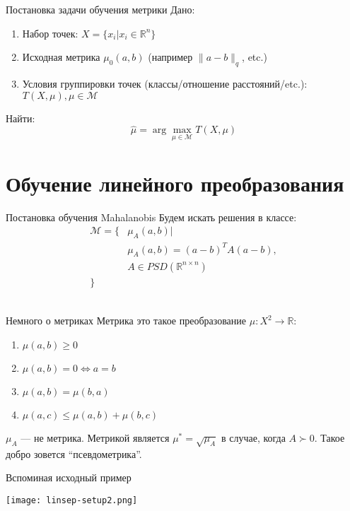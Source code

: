\documentclass[14pt, fleqn, xcolor={dvipsnames, table}]{beamer}
\begin{document}
\begin{frame}{Постановка задачи обучения метрики}{}
{\color{blue}Дано:}
\begin{enumerate}
  \item Набор точек: $X = \{x_i | x_i \in \mathbb{R}^n\}$
  \item Исходная метрика $\mu_0(a,b)$ (например $\|a - b\|_q$, etc.)
  \item Условия группировки точек (классы/отношение расстояний/etc.): $T(X, \mu), \mu \in \mathcal{M}$
\end{enumerate}
{\color{blue}Найти:}\\
$$
\hat{\mu} = \arg \max_{\mu \in \mathcal{M}} T(X, \mu)
$$
\end{frame}

\section{Обучение линейного преобразования}

\begin{frame}{Постановка обучения Mahalanobis}{}
Будем искать решения в классе:
$$\begin{array}{ll}
\mathcal{M} = \{&\mu_A(a,b) | \\
& \mu_A(a,b) = (a - b)^T A (a - b), \\
& A \in PSD(\mathbb{R}^{n \times n})\\
\} &
\end{array}$$
\\
\end{frame}

\begin{frame}{Немного о метриках}{}
\small
Метрика это такое преобразование $\mu : X^2 \to \mathbb{R}$:
\begin{enumerate}
  \item $\mu(a,b) \ge 0$
  \item $\mu(a,b) = 0 \Leftrightarrow a = b$
  \item $\mu(a,b) = \mu(b,a)$
  \item $\mu(a,c) \le \mu(a,b) + \mu(b,c)$
\end{enumerate}
$\mu_A$ --- не метрика. Метрикой является $\mu^{*} = \sqrt{\mu_A}$ в случае, когда $A \succ 0$. Такое добро зовется ``псевдометрика''.
\end{frame}

\begin{frame}{Вспоминая исходный пример}
\begin{center}
\texttt{[image: linsep-setup2.png]}
\end{center}
\end{frame}
\end{document}
